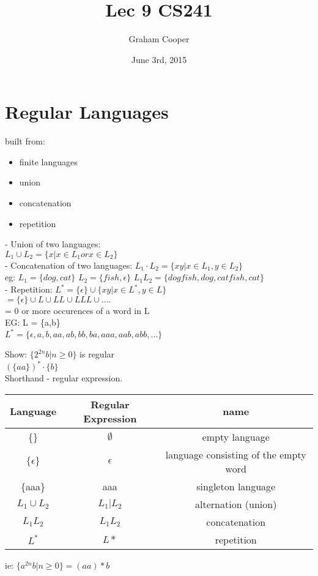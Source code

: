 \documentclass[12pt]{article}
\title{\vspace{-15ex}Lec 9 CS241\vspace{-1ex}}
\date{June 3rd, 2015}
\author{Graham Cooper}
\begin{document}
	\maketitle
	
	\section*{Regular Languages}
	built from:
	\begin{itemize}
		\item finite languages
		\item union
		\item concatenation
		\item repetition
	\end{itemize}
	- Union of two languages:\\
	$L_1 \cup L_2 = \{x | x \in L_1 or x \in L_2\}$\\
	- Concatenation of two languages:
	$L_1 \cdot L_2 = \{xy | x \in L_1, y \in L_2\}$\\
	eg: $L_1 = \{dog, cat\}$
	$L_2 = \{fish, \epsilon \}$
	$L_1L_2 = \{dogfish, dog, catfish, cat\}$\\
	
	- Repetition:
	$L^* = \{\epsilon \} \cup \{xy | x \in L^*, y \in L \}$\\
	$ = \{\epsilon \} \cup L \cup LL \cup LLL \cup .... $\\
	= 0 or more occurences of a word in L\\
	
	EG: L = \{a,b\}\\
	$L^* = \{\epsilon, a, b, aa, ab, bb, ba, aaa, aab, abb, ... \}$
	
	Show: $\{2^{2n}b | n \geq 0 \}$ is regular\\
	$(\{aa\})^* \cdot \{b\}$\\
	
	Shorthand - regular expression.\\
	
	\begin{tabular}{c | c | c}
		Language & Regular Expression & name \\ \hline
		\{\}     & $\emptyset$ & empty language\\
		$\{\epsilon \}$ & $\epsilon$ & language consisting of the empty word\\
		\{aaa\} & aaa & singleton language\\
		$L_1 \cup L_2$ & $L_1 | L_2$ & alternation (union) \\
		$L_1L_2$ & $L_1L_2$ & concatenation\\
		$L^*$ & $L*$ & repetition \\ 
	\end{tabular}
	ie: $\{a^{2n}b | n \geq 0\} = (aa)*b$\\
	
\end{document}
